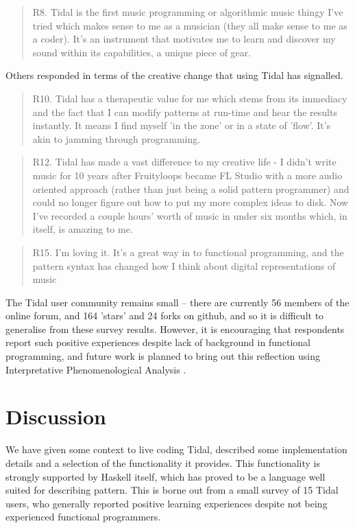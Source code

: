 \documentclass[authoryear,preprint]{sigplanconf}
\begin{document}
\begin{quotation} R8. Tidal is the first music programming or
algorithmic music thingy I've tried which makes sense to me as a
musician (they all make sense to me as a coder). It's an instrument
that motivates me to learn and discover my sound within its
capabilities, a unique piece of gear.
\end{quotation}

Others responded in terms of the creative change that using Tidal has
signalled.

\begin{quotation}R10. Tidal has a therapeutic value for me which stems from its
immediacy and the fact that I can modify patterns at run-time and hear
the results instantly. It means I find myself 'in the zone' or in a
state of 'flow'. It's akin to jamming through programming.
\end{quotation}

\begin{quotation}
R12. Tidal has made a vast difference to my creative life - I didn't
write music for 10 years after Fruityloops became FL Studio with a
more audio oriented approach (rather than just being a solid pattern
programmer) and could no longer figure out how to put my more complex
ideas to disk. Now I've recorded a couple hours' worth of music in
under six months which, in itself, is amazing to me.
\end{quotation}

\begin{quotation}
R15. I'm loving it. It's a great way in to functional programming, and
the pattern syntax has changed how I think about digital
representations of music
\end{quotation}

The Tidal user community remains small -- there are currently 56
members of the online forum, and 164 'stars' and 24 forks on github,
and so it is difficult to generalise from these survey
results. However, it is encouraging that respondents report such
positive experiences despite lack of background in functional
programming, and future work is planned to bring out this reflection
using Interpretative Phenomenological Analysis
\citep[IPA;][]{Smith04}.

\section{Discussion}

We have given some context to live coding Tidal, described some
implementation details and a selection of the functionality it
provides. This functionality is strongly supported by Haskell itself, which
has proved to be a language well suited for describing pattern. This
is borne out from a small survey of 15 Tidal users, who generally
reported positive learning experiences despite not being experienced
functional programmers.
\end{document}
